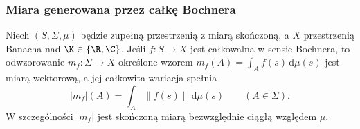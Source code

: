 \subsubsection{Miara generowana przez całkę Bochnera}

\begin{twierdzenie}
\label{thm:bochner-measure15b}
Niech $(S,\Sigma,\mu)$ będzie zupełną przestrzenią z miarą
skończoną, a $X$ przestrzenią Banacha nad $\K\in\{\R,\C\}$.
Jeśli $f:S\to X$ jest całkowalna w sensie Bochnera, to
odwzorowanie $m_f:\Sigma\to X$ określone wzorem
$m_f(A)=\int_Af(s)\,\mathrm d\mu(s)$ jest miarą wektorową,
a jej całkowita wariacja spełnia
\[
 |m_f|(A)=\int_A\|f(s)\|\,\mathrm d\mu(s)
 \qquad(A\in\Sigma).
\]
W szczególności $|m_f|$ jest skończoną miarą bezwzględnie
ciągłą względem $\mu$.
\end{twierdzenie}
